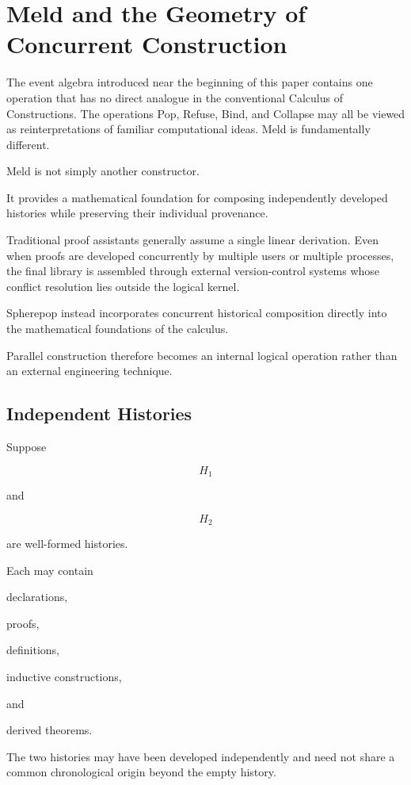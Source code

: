 \documentclass[12pt,oneside]{article}
\theoremstyle{definition}
\theoremstyle{remark}
\begin{document}
\section{Meld and the Geometry of Concurrent Construction}

The event algebra introduced near the beginning of this paper contains one
operation that has no direct analogue in the conventional Calculus of
Constructions. The operations Pop, Refuse, Bind, and Collapse may all be viewed
as reinterpretations of familiar computational ideas. Meld is fundamentally
different.

Meld is not simply another constructor.

It provides a mathematical foundation for composing independently developed
histories while preserving their individual provenance.

Traditional proof assistants generally assume a single linear derivation. Even
when proofs are developed concurrently by multiple users or multiple processes,
the final library is assembled through external version-control systems whose
conflict resolution lies outside the logical kernel.

Spherepop instead incorporates concurrent historical composition directly into
the mathematical foundations of the calculus.

Parallel construction therefore becomes an internal logical operation rather
than an external engineering technique.

\subsection{Independent Histories}

Suppose

\[
H_1
\]

and

\[
H_2
\]

are well-formed histories.

Each may contain

declarations,

proofs,

definitions,

inductive constructions,

and

derived theorems.

The two histories may have been developed independently and need not share a
common chronological origin beyond the empty history.
\end{document}
